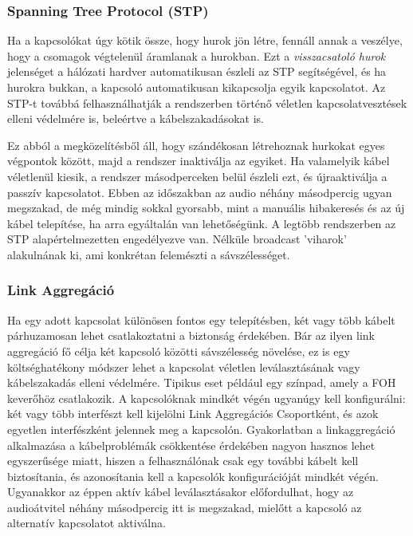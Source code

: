 \subsubsection{Spanning Tree Protocol (STP)}
Ha a kapcsolókat úgy kötik össze, hogy hurok jön létre, fennáll annak a veszélye, 
hogy a csomagok végtelenül áramlanak a hurokban. 
Ezt a \textit{visszacsatoló hurok} jelenséget a hálózati hardver automatikusan észleli az
STP segítségével, és ha hurokra bukkan, a kapcsoló automatikusan kikapcsolja egyik
kapcsolatot. Az STP-t továbbá felhasználhatják a rendszerben történő véletlen
kapcsolatvesztések elleni védelmére is, beleértve a kábelszakadásokat is. 

Ez abból a megközelítésből áll, hogy szándékosan létrehoznak hurkokat egyes végpontok között, majd a rendszer
inaktiválja az egyiket. Ha valamelyik kábel véletlenül kiesik, a rendszer
másodperceken belül észleli ezt, és újraaktiválja a passzív kapcsolatot. Ebben
az időszakban az audio néhány másodpercig ugyan megszakad, de még mindig sokkal
gyorsabb, mint a manuális hibakeresés és az új kábel telepítése, ha arra egyáltalán van lehetőségünk.
A legtöbb rendszerben az STP alapértelmezetten engedélyezve van. 
Nélküle broadcast 'viharok' alakulnának ki, ami konkrétan felemészti a sávszélességet.
\subsubsection{Link Aggregáció}
Ha egy adott kapcsolat különösen fontos egy telepítésben, két vagy több kábelt párhuzamosan
lehet csatlakoztatni a biztonság érdekében. 
Bár az ilyen link aggregáció fő célja két kapcsoló közötti sávszélesség növelése, 
ez is egy költséghatékony módszer lehet a kapcsolat véletlen leválasztásának
vagy kábelszakadás elleni védelmére. Tipikus eset például egy színpad, amely a FOH keverőhöz
csatlakozik. A kapcsolóknak mindkét végén ugyanúgy kell konfigurálni: két vagy
több interfészt kell kijelölni Link Aggregációs Csoportként, és azok
egyetlen interfészként jelennek meg a kapcsolón. Gyakorlatban a linkaggregáció
alkalmazása a kábelproblémák csökkentése érdekében nagyon hasznos lehet
egyszerűsége miatt, hiszen a felhasználónak csak egy további kábelt kell
biztosítania, és azonosítania kell a kapcsolók konfigurációját mindkét végén.
Ugyanakkor az éppen aktív kábel leválasztásakor előfordulhat, hogy az audioátvitel
néhány másodpercig itt is megszakad, mielőtt a kapcsoló az alternatív kapcsolatot
aktiválna.
